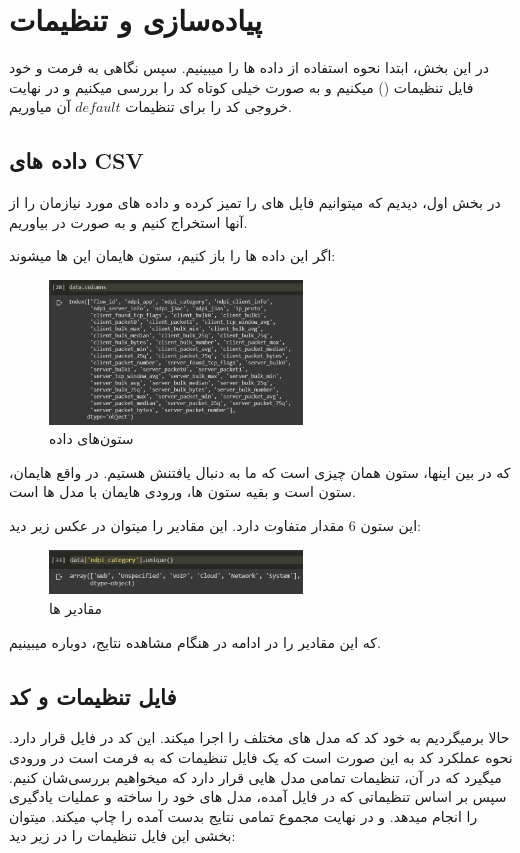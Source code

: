 \section{پیاده‌سازی و تنظیمات}

در این بخش، ابتدا نحوه استفاده از داده ها را میبینیم. سپس نگاهی به فرمت و خود فایل تنظیمات () میکنیم و به صورت خیلی کوتاه کد را بررسی میکنیم و در نهایت خروجی کد را برای تنظیمات $default$ آن میاوریم. 

\subsection{داده های CSV}

در بخش اول، دیدیم که میتوانیم فایل های 
را تمیز کرده و داده های مورد نیازمان را از آنها استخراج کنیم و به صورت 
در بیاوریم. 

اگر این داده ها را باز کنیم، ستون هایمان این ها میشوند:

\begin{figure}[h]
	\centering
	\includegraphics[width=0.6\textwidth]{training/6}
	\caption{ستون‌های داده}
	\label{fig:training:data-columns}
\end{figure} 


که در بین اینها، ستون 
همان چیزی است که ما به دنبال یافتنش هستیم. در واقع 
هایمان، ستون 
است و بقیه ستون ها، ورودی هایمان با مدل ها است. 

این ستون 6 مقدار متفاوت دارد. این مقادیر را میتوان در عکس زیر دید:
\begin{figure}[h]
	\centering
	\includegraphics[width=0.6\textwidth]{training/7}
	\caption{مقادیر  ها}
	\label{fig:training:class-labels}
\end{figure} 
 که این مقادیر را در ادامه در هنگام مشاهده نتایج، دوباره میبینیم.
 

\subsection{فایل تنظیمات و کد} 
حالا برمیگردیم به خود کد که مدل های مختلف را اجرا میکند. این کد در فایل 
قرار دارد. نحوه عملکرد کد به این صورت است که یک فایل تنظیمات که به فرمت 
است در ورودی میگیرد که در آن، تنظیمات تمامی مدل هایی قرار دارد که میخواهیم بررسی‌شان کنیم. سپس بر اساس تنظیماتی که در فایل آمده، مدل های خود را ساخته و عملیات یادگیری را انجام میدهد. و در نهایت مجموع تمامی نتایج بدست آمده را چاپ میکند. میتوان بخشی این فایل تنظیمات را در زیر دید:

